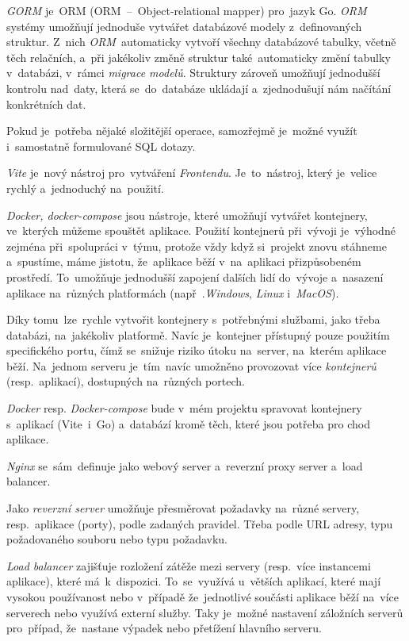\documentclass[10pt,a4paper]{article}
\begin{document}
            \emph{GORM} je~ORM (ORM~--~Object-relational mapper) pro~jazyk Go. \emph{ORM} systémy umožňují jednoduše vytvářet databázové modely z~definovaných struktur. Z~nich \emph{ORM}~automaticky vytvoří všechny databázové tabulky, včetně těch relačních, a~při jakékoliv změně struktur také~automaticky změní tabulky v~databázi, v~rámci \emph{migrace modelů}. Struktury zároveň umožňují jednodušší kontrolu nad~daty, která se~do~databáze ukládají a~zjednodušují nám načítání konkrétních dat.

            Pokud je~potřeba nějaké složitější operace, samozřejmě je~možné využít i~samostatně formulované SQL dotazy. \cite{gormGORM, freecodecamp:orm}

            \emph{Vite} je~nový nástroj pro~vytváření \emph{Frontendu}. Je~to~nástroj, který je~velice rychlý a~jednoduchý na~použití.

            \emph{Docker, docker-compose} jsou nástroje, které umožňují vytvářet kontejnery, ve~kterých můžeme spouštět aplikace. Použití kontejnerů při~vývoji je~výhodné zejména při~spolupráci v~týmu, protože vždy když si~projekt znovu stáhneme a~spustíme, máme jistotu, že~aplikace běží v~na~aplikaci přizpůsobeném prostředí. To~umožňuje jednodušší zapojení dalších lidí do~vývoje a~nasazení aplikace na~různých platformách (např~.\emph{Windows}, \emph{Linux} i~\emph{MacOS}).

            Díky tomu~lze~rychle vytvořit kontejnery s~potřebnými službami, jako třeba databázi, na~jakékoliv platformě. Navíc je~kontejner přístupný pouze použitím specifického portu, čímž se~snižuje riziko útoku na~server, na~kterém aplikace běží. Na~jednom serveru je~tím~navíc umožněno provozovat více \emph{kontejnerů} (resp.~aplikací), dostupných na~různých portech. \cite{docker}

            \emph{Docker} resp. \emph{Docker-compose} bude v~mém projektu spravovat kontejnery s~aplikací (Vite~i~Go) a~databází kromě těch, které jsou potřeba pro chod aplikace.

            \emph{Nginx} se~sám~definuje jako webový server a~reverzní proxy server a~load balancer.

            Jako \emph{reverzní server} umožňuje přesměrovat požadavky na~různé servery, resp.~aplikace (porty), podle zadaných pravidel. Třeba podle URL adresy, typu požadovaného souboru nebo typu požadavku.
            
            \emph{Load balancer} zajišťuje rozložení zátěže mezi servery (resp.~více instancemi aplikace), které má~k~dispozici. To~se~využívá u~větších aplikací, které mají vysokou používanost nebo v~případě že~jednotlivé součásti aplikace běží na~více serverech nebo využívá externí služby. Taky je~možné nastavení záložních serverů pro~případ, že~nastane výpadek nebo přetížení hlavního serveru.
            
\end{document}
